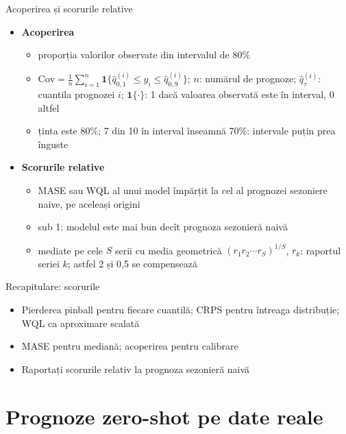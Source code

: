 \begin{frame}{Acoperirea și scorurile relative}
\itemsize{\small}
\begin{itemize}
    \item \textbf{Acoperirea}
    \begin{itemize}
        \item proporția valorilor observate din intervalul de 80\%
        \item $\text{Cov} = \frac1n\sum_{i=1}^{n} \mathbf{1}\{\hat q_{0{,}1}^{(i)} \le y_i \le \hat q_{0{,}9}^{(i)}\}$; $n$: numărul de prognoze; $\hat q_{\tau}^{(i)}$: cuantila prognozei $i$; $\mathbf{1}\{\cdot\}$: 1 dacă valoarea observată este în interval, 0 altfel
        \item ținta este 80\%; 7 din 10 în interval înseamnă 70\%: intervale puțin prea înguste
    \end{itemize}
    \item \textbf{Scorurile relative}
    \begin{itemize}
        \item MASE sau WQL al unui model împărțit la cel al prognozei sezoniere naive, pe aceleași origini
        \item sub 1: modelul este mai bun decît prognoza sezonieră naivă
        \item mediate pe cele $S$ serii cu media geometrică $(r_1 r_2 \cdots r_S)^{1/S}$, $r_k$: raportul seriei $k$; astfel 2 și 0,5 se compensează
    \end{itemize}
\end{itemize}
\end{frame}

\begin{frame}{Recapitulare: scorurile}
\itemsize{\small}
\begin{itemize}
    \item Pierderea pinball pentru fiecare cuantilă; CRPS pentru întreaga distribuție; WQL ca aproximare scalată
    \item MASE pentru mediană; acoperirea pentru calibrare
    \item Raportați scorurile relativ la prognoza sezonieră naivă
\end{itemize}
\end{frame}


\section{Prognoze zero-shot pe date reale}

